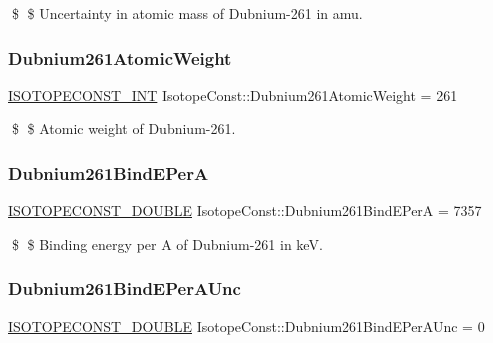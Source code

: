 \$ \$ Uncertainty in atomic mass of Dubnium-\/261 in amu. \mbox{\label{group___isotope_const-_dubnium-_db261_gab54943972be16d9787c72780b598ff8d}} 
\subsubsection{\texorpdfstring{Dubnium261\+Atomic\+Weight}{Dubnium261AtomicWeight}}
{\footnotesize\ttfamily \mbox{\hyperlink{group___isotope_const-_macros_ga5f18360b3e99483a35c32d789e62621c}{I\+S\+O\+T\+O\+P\+E\+C\+O\+N\+S\+T\+\_\+\+I\+NT}} Isotope\+Const\+::\+Dubnium261\+Atomic\+Weight = 261}

\$ \$ Atomic weight of Dubnium-\/261. \mbox{\label{group___isotope_const-_dubnium-_db261_ga73ec8618252cf1ee24a750b760cd3a56}} 
\subsubsection{\texorpdfstring{Dubnium261\+Bind\+E\+PerA}{Dubnium261BindEPerA}}
{\footnotesize\ttfamily \mbox{\hyperlink{group___isotope_const-_macros_ga8f45a7272ce02c0b4c65c44636ed719a}{I\+S\+O\+T\+O\+P\+E\+C\+O\+N\+S\+T\+\_\+\+D\+O\+U\+B\+LE}} Isotope\+Const\+::\+Dubnium261\+Bind\+E\+PerA = 7357}

\$ \$ Binding energy per A of Dubnium-\/261 in keV. \mbox{\label{group___isotope_const-_dubnium-_db261_ga98ebde9c9440e632393e8fea3906985c}} 
\subsubsection{\texorpdfstring{Dubnium261\+Bind\+E\+Per\+A\+Unc}{Dubnium261BindEPerAUnc}}
{\footnotesize\ttfamily \mbox{\hyperlink{group___isotope_const-_macros_ga8f45a7272ce02c0b4c65c44636ed719a}{I\+S\+O\+T\+O\+P\+E\+C\+O\+N\+S\+T\+\_\+\+D\+O\+U\+B\+LE}} Isotope\+Const\+::\+Dubnium261\+Bind\+E\+Per\+A\+Unc = 0}

